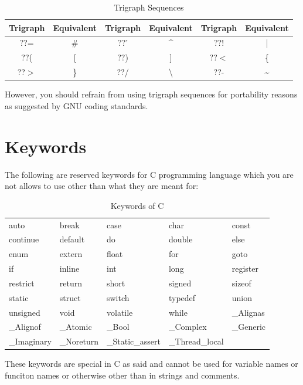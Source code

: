 \begin{table}
 \begin{center}
 \caption{Trigraph Sequences}
\begin{tabular}{|c|c|c|c|c|c|}
\hline
\textbf{Trigraph}&\textbf{Equivalent}&\textbf{Trigraph}&\textbf{Equivalent}&\textbf{Trigraph}&\textbf{Equivalent}\\
\hline
??=&\#&??'&\textasciicircum&??!&|\\
\hline
??(&[&??)&]&??$<$&\{\\
\hline
??$>$&\}&??/&\textbackslash&??-&\textasciitilde\\
\hline
\end{tabular}
\end{center}
\end{table}

However, you should refrain from using trigraph sequences for portability 
reasons as suggested by GNU coding standards.

\section{Keywords}
The following are reserved keywords for C programming language which you are not 
allows to use other than what they are meant for:
\begin{table}[H]
 \begin{center}
  \caption{Keywords of C}
  \begin{tabular}{l l l l l}
    auto & break & case & char & const\\
    continue & default & do & double & else\\
    enum & extern & float & for & goto\\
    if & inline & int & long & register\\
    restrict & return & short & signed & sizeof\\
    static & struct & switch & typedef  & union\\
    unsigned & void & volatile & while & \_Alignas\\
    \_Alignof& \_Atomic & \_Bool & \_Complex & \_Generic \\
    \_Imaginary & \_Noreturn & \_Static\_assert & \_Thread\_local\\
  \end{tabular}
 \end{center}
\end{table}

These keywords are special in C as said and cannot be used for variable names 
or funciton names or otherwise other than in strings and comments.

